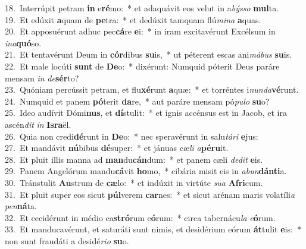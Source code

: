 {18.~}Interrúpit petram \textbf{in} e\textbf{ré}mo:~* et adaquávit eos velut in a\textit{býs}\textit{so} \textbf{mul}ta.\\
{19.~}Et edúxit \textbf{a}quam de \textbf{pe}tra:~* et dedúxit tamquam flú\textit{mi}\textit{na} \textbf{a}quas.\\
{20.~}Et apposuérunt adhuc pec\textbf{cá}re \textbf{e}i:~* in iram excitavérunt Excélsum in \textit{i}\textit{na}\textbf{quó}so.\\
{21.~}Et tentavérunt Deum in \textbf{cór}dibus \textbf{su}is,~* ut péterent escas ani\textit{má}\textit{bus} \textbf{su}is.\\
{22.~}Et male locúti \textbf{sunt} de \textbf{De}o:~* dixérunt: Numquid póterit Deus paráre mensam \textit{in} \textit{de}\textbf{sér}to?\\
{23.~}Quóniam percússit petram, et flu\textbf{xé}runt \textbf{a}quæ:~* et torréntes i\textit{nun}\textit{da}\textbf{vé}runt.\\
{24.~}Numquid et panem \textbf{pó}terit \textbf{da}re,~* aut paráre mensam pó\textit{pu}\textit{lo} \textbf{su}o?\\
{25.~}Ideo audívit Dómi\textbf{nus}, et \textbf{dí}stulit:~* et ignis accénsus est in Jacob, et ira ascén\textit{dit} \textit{in} \textbf{Is}\textbf{ra}ël.\\
{26.~}Quia non credi\textbf{dé}runt in \textbf{De}o:~* nec speravérunt in salu\textit{tá}\textit{ri} \textbf{e}jus:\\
{27.~}Et mandávit \textbf{nú}bibus \textbf{dé}super:~* et jánuas cæ\textit{li} \textit{a}\textbf{pé}\textbf{ru}it.\\
{28.~}Et pluit illis manna ad \textbf{man}du\textbf{cán}dum:~* et panem cæli \textit{de}\textit{dit} \textbf{e}is.\\
{29.~}Panem Angelórum mandu\textbf{cá}vit \textbf{ho}mo,~* cibária misit eis in \textit{a}\textit{bun}\textbf{dán}\textbf{ti}a.\\
{30.~}Tránstulit \textbf{Au}strum de \textbf{cæ}lo:~* et indúxit in virtúte \textit{su}\textit{a} \textbf{A}\textbf{fri}cum.\\
{31.~}Et pluit super eos sicut \textbf{púl}verem \textbf{car}nes:~* et sicut arénam maris volatíli\textit{a} \textit{pen}\textbf{ná}ta.\\
{32.~}Et cecidérunt in médio ca\textbf{stró}rum e\textbf{ó}rum:~* circa tabernácu\textit{la} \textit{e}\textbf{ó}rum.\\
{33.~}Et manducavérunt, et saturáti sunt nimis, et desidérium eórum \textbf{át}tulit \textbf{e}is:~* non sunt fraudáti a desidé\textit{ri}\textit{o} \textbf{su}o.\\
